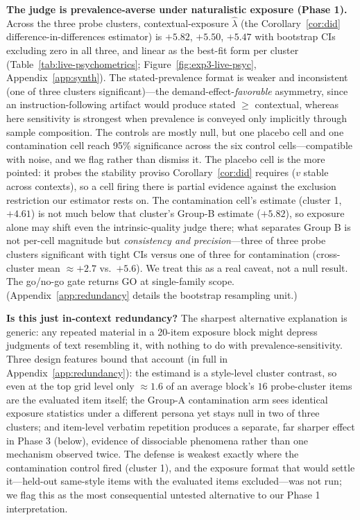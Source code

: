 ﻿\documentclass[11pt]{article}
\begin{document}
\textbf{The judge is prevalence-averse under naturalistic exposure (Phase 1).} Across the three probe clusters, contextual-exposure \(\hat\lambda\) (the Corollary~\ref{cor:did} difference-in-differences estimator) is \(+5.82\), \(+5.50\), \(+5.47\) with bootstrap CIs excluding zero in all three, and linear as the best-fit form per cluster (Table~\ref{tab:live-psychometrics}; Figure~\ref{fig:exp3-live-psyc}, Appendix~\ref{app:synth}). The stated-prevalence format is weaker and inconsistent (one of three clusters significant)---the demand-effect-\emph{favorable} asymmetry, since an instruction-following artifact would produce stated \(\geq\) contextual, whereas here sensitivity is strongest when prevalence is conveyed only implicitly through sample composition. The controls are mostly null, but one placebo cell and one contamination cell reach 95\% significance across the six control cells---compatible with noise, and we flag rather than dismiss it. The placebo cell is the more pointed: it probes the stability proviso Corollary~\ref{cor:did} requires (\(v\) stable across contexts), so a cell firing there is partial evidence against the exclusion restriction our estimator rests on. The contamination cell's estimate (cluster 1, \(+4.61\)) is not much below that cluster's Group-B estimate (\(+5.82\)), so exposure alone may shift even the intrinsic-quality judge there; what separates Group B is not per-cell magnitude but \emph{consistency and precision}---three of three probe clusters significant with tight CIs versus one of three for contamination (cross-cluster mean \(\approx +2.7\) vs.\ \(+5.6\)). We treat this as a real caveat, not a null result. The go/no-go gate returns GO at single-family scope. (Appendix~\ref{app:redundancy} details the bootstrap resampling unit.)

\textbf{Is this just in-context redundancy?} The sharpest alternative explanation is generic: any repeated material in a 20-item exposure block might depress judgments of text resembling it, with nothing to do with prevalence-sensitivity. Three design features bound that account (in full in Appendix~\ref{app:redundancy}): the estimand is a style-level cluster contrast, so even at the top grid level only \(\approx 1.6\) of an average block's \(16\) probe-cluster items are the evaluated item itself; the Group-A contamination arm sees identical exposure statistics under a different persona yet stays null in two of three clusters; and item-level verbatim repetition produces a separate, far sharper effect in Phase 3 (below), evidence of dissociable phenomena rather than one mechanism observed twice. The defense is weakest exactly where the contamination control fired (cluster 1), and the exposure format that would settle it---held-out same-style items with the evaluated items excluded---was not run; we flag this as the most consequential untested alternative to our Phase 1 interpretation.
\end{document}
